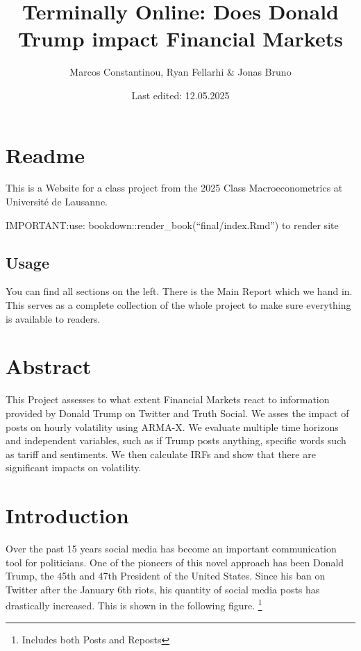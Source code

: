 \documentclass[
]{book}
\title{Terminally Online: Does Donald Trump impact Financial Markets}
\author{Marcos Constantinou, Ryan Fellarhi \& Jonas Bruno}
\date{Last edited: 12.05.2025}
\begin{document}
\maketitle

{
\setcounter{tocdepth}{1}
\tableofcontents
}
\chapter*{Readme}\label{readme}

This is a Website for a class project from the 2025 Class Macroeconometrics at Université de Lausanne.

IMPORTANT:use: bookdown::render\_book(``final/index.Rmd'') to render site

\section*{Usage}\label{usage}

You can find all sections on the left. There is the Main Report which we hand in. This serves as a complete collection of the whole project to make sure everything is available to readers.

\chapter*{Abstract}\label{abstract}

This Project assesses to what extent Financial Markets react to information provided by Donald Trump on Twitter and Truth Social. We asses the impact of posts on hourly volatility using ARMA-X. We evaluate multiple time horizons and independent variables, such as if Trump posts anything, specific words such as tariff and sentiments. We then calculate IRFs and show that there are significant impacts on volatility.

\chapter{Introduction}\label{introduction}

Over the past 15 years social media has become an important
communication tool for politicians. One of the pioneers of this novel
approach has been Donald Trump, the 45th and 47th President of the United
States. Since his ban on Twitter after the January 6th riots, his quantity of
social media posts has drastically increased. This is shown in the following
figure. \footnote{Includes both Posts and Reposts}
\end{document}
